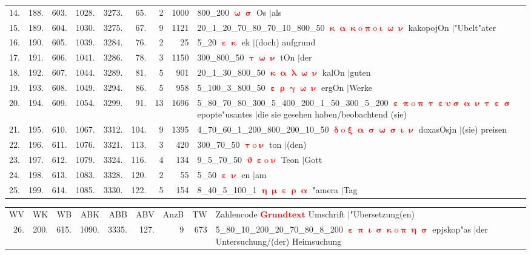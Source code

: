 \documentclass[a4paper,10pt,landscape]{article}
\begin{document}
\begin{tabular}{rrrrrrrrp{120mm}}
14.&188.&603.&1028.&3273.&65.&2&1000&800\_200 \textcolor{red}{$\boldsymbol{\upomega\upsigma}$} Os $|$als\\
15.&189.&604.&1030.&3275.&67.&9&1121&20\_1\_20\_70\_80\_70\_10\_800\_50 \textcolor{red}{$\boldsymbol{\upkappa\upalpha\upkappa\mathrm{o}\uppi\mathrm{o}\upiota\upomega\upnu}$} kakopojOn $|$"Ubelt"ater\\
16.&190.&605.&1039.&3284.&76.&2&25&5\_20 \textcolor{red}{$\boldsymbol{\upepsilon\upkappa}$} ek $|$(doch) aufgrund\\
17.&191.&606.&1041.&3286.&78.&3&1150&300\_800\_50 \textcolor{red}{$\boldsymbol{\uptau\upomega\upnu}$} tOn $|$der\\
18.&192.&607.&1044.&3289.&81.&5&901&20\_1\_30\_800\_50 \textcolor{red}{$\boldsymbol{\upkappa\upalpha\uplambda\upomega\upnu}$} kalOn $|$guten\\
19.&193.&608.&1049.&3294.&86.&5&958&5\_100\_3\_800\_50 \textcolor{red}{$\boldsymbol{\upepsilon\uprho\upgamma\upomega\upnu}$} ergOn $|$Werke\\
20.&194.&609.&1054.&3299.&91.&13&1696&5\_80\_70\_80\_300\_5\_400\_200\_1\_50\_300\_5\_200 \textcolor{red}{$\boldsymbol{\upepsilon\uppi\mathrm{o}\uppi\uptau\upepsilon\upsilon\upsigma\upalpha\upnu\uptau\upepsilon\upsigma}$} epopte"usantes $|$die sie gesehen haben/beobachtend (sie)\\
21.&195.&610.&1067.&3312.&104.&9&1395&4\_70\_60\_1\_200\_800\_200\_10\_50 \textcolor{red}{$\boldsymbol{\updelta\mathrm{o}\upxi\upalpha\upsigma\upomega\upsigma\upiota\upnu}$} doxasOsjn $|$(sie) preisen\\
22.&196.&611.&1076.&3321.&113.&3&420&300\_70\_50 \textcolor{red}{$\boldsymbol{\uptau\mathrm{o}\upnu}$} ton $|$(den)\\
23.&197.&612.&1079.&3324.&116.&4&134&9\_5\_70\_50 \textcolor{red}{$\boldsymbol{\upvartheta\upepsilon\mathrm{o}\upnu}$} Teon $|$Gott\\
24.&198.&613.&1083.&3328.&120.&2&55&5\_50 \textcolor{red}{$\boldsymbol{\upepsilon\upnu}$} en $|$am\\
25.&199.&614.&1085.&3330.&122.&5&154&8\_40\_5\_100\_1 \textcolor{red}{$\boldsymbol{\upeta\upmu\upepsilon\uprho\upalpha}$} "amera $|$Tag\\
\end{tabular}
\newpage
\begin{tabular}{rrrrrrrrp{120mm}}
WV&WK&WB&ABK&ABB&ABV&AnzB&TW&Zahlencode \textcolor{red}{$\boldsymbol{Grundtext}$} Umschrift $|$"Ubersetzung(en)\\
26.&200.&615.&1090.&3335.&127.&9&673&5\_80\_10\_200\_20\_70\_80\_8\_200 \textcolor{red}{$\boldsymbol{\upepsilon\uppi\upiota\upsigma\upkappa\mathrm{o}\uppi\upeta\upsigma}$} epjskop"as $|$der Untersuchung/(der) Heimsuchung\\
\end{tabular}\medskip \\
\end{document}
